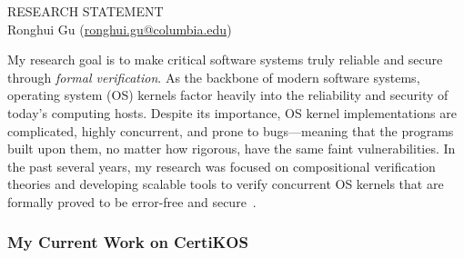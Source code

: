\documentclass[a4paper, 10pt]{article}
\newcommand*{\email}[1]{\normalsize\href{mailto:#1}{#1}}
\begin{document}
\begin{small}

\begin{center}
{RESEARCH STATEMENT}\\
\vspace*{0.2cm}
{\normalsize Ronghui Gu (\email{ronghui.gu@columbia.edu})}
\end{center}



My research goal is to make critical software systems truly reliable and secure through \emph{formal verification}.
As the backbone of 
modern software systems,
operating system (OS) kernels
factor heavily into the reliability and security of today's computing hosts. 
Despite its importance,
OS kernel implementations are complicated, highly concurrent, and prone to bugs---meaning that the programs built upon them, no matter how rigorous, have the same faint vulnerabilities.
In the past several years,  my research was focused on compositional 
verification theories and developing scalable tools to verify concurrent OS kernels that are formally proved to be error-free and secure~\cite{popl15-gu, osdi16-gu, pldi16-security, pldi16-device, cav17-yuan, oopsla17-zhai, aplas17-kim, jar-device, pldi18-gu, sosp19-nelson, sosp19-zou,cacm-gu}.



\subsubsection*{\large My Current Work on CertiKOS}


\end{small}
\end{document}
